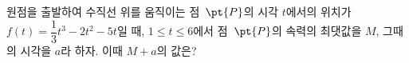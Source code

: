 원점을 출발하여 수직선 위를 움직이는 점~$\pt{P}$의 시각 $t$에서의 위치가 $f(t)=\dfrac{1}{3}t^3-2t^2-5t$일 때, $1\le t\le 6$에서 점~$\pt{P}$의 속력의 최댓값을 $M$, 그때의 시각을 $a$라 하자. 이때 $M+a$의 값은?
